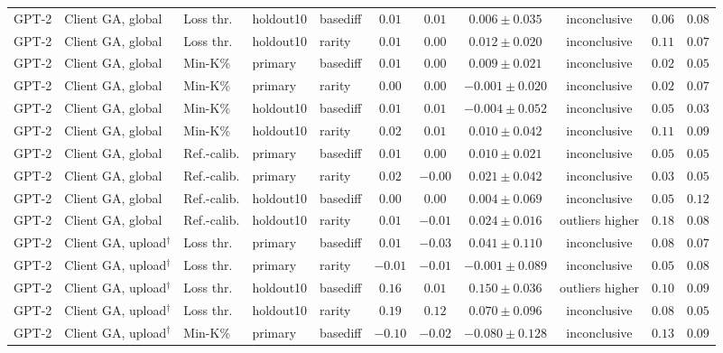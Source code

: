 \begin{table}[t]
\begin{tabular*}{\textwidth}{@{\extracolsep{\fill}}lllllcccccc@{}}
GPT-2 & Client GA, global & Loss thr. & holdout10 & basediff & $0.01$ & $0.01$ & $0.006 \pm 0.035$ & inconclusive & $0.06$ & $0.08$ \\
GPT-2 & Client GA, global & Loss thr. & holdout10 & rarity & $0.01$ & $0.00$ & $0.012 \pm 0.020$ & inconclusive & $0.11$ & $0.07$ \\
GPT-2 & Client GA, global & Min-K\% & primary & basediff & $0.01$ & $0.00$ & $0.009 \pm 0.021$ & inconclusive & $0.02$ & $0.05$ \\
GPT-2 & Client GA, global & Min-K\% & primary & rarity & $0.00$ & $0.00$ & $-0.001 \pm 0.020$ & inconclusive & $0.02$ & $0.07$ \\
GPT-2 & Client GA, global & Min-K\% & holdout10 & basediff & $0.01$ & $0.01$ & $-0.004 \pm 0.052$ & inconclusive & $0.05$ & $0.03$ \\
GPT-2 & Client GA, global & Min-K\% & holdout10 & rarity & $0.02$ & $0.01$ & $0.010 \pm 0.042$ & inconclusive & $0.11$ & $0.09$ \\
GPT-2 & Client GA, global & Ref.-calib. & primary & basediff & $0.01$ & $0.00$ & $0.010 \pm 0.021$ & inconclusive & $0.05$ & $0.05$ \\
GPT-2 & Client GA, global & Ref.-calib. & primary & rarity & $0.02$ & $-0.00$ & $0.021 \pm 0.042$ & inconclusive & $0.03$ & $0.05$ \\
GPT-2 & Client GA, global & Ref.-calib. & holdout10 & basediff & $0.00$ & $0.00$ & $0.004 \pm 0.069$ & inconclusive & $0.05$ & $0.12$ \\
GPT-2 & Client GA, global & Ref.-calib. & holdout10 & rarity & $0.01$ & $-0.01$ & $0.024 \pm 0.016$ & outliers higher & $0.18$ & $0.08$ \\
GPT-2 & Client GA, upload$^{\dagger}$ & Loss thr. & primary & basediff & $0.01$ & $-0.03$ & $0.041 \pm 0.110$ & inconclusive & $0.08$ & $0.07$ \\
GPT-2 & Client GA, upload$^{\dagger}$ & Loss thr. & primary & rarity & $-0.01$ & $-0.01$ & $-0.001 \pm 0.089$ & inconclusive & $0.05$ & $0.08$ \\
GPT-2 & Client GA, upload$^{\dagger}$ & Loss thr. & holdout10 & basediff & $0.16$ & $0.01$ & $0.150 \pm 0.036$ & outliers higher & $0.10$ & $0.09$ \\
GPT-2 & Client GA, upload$^{\dagger}$ & Loss thr. & holdout10 & rarity & $0.19$ & $0.12$ & $0.070 \pm 0.096$ & inconclusive & $0.08$ & $0.05$ \\
GPT-2 & Client GA, upload$^{\dagger}$ & Min-K\% & primary & basediff & $-0.10$ & $-0.02$ & $-0.080 \pm 0.128$ & inconclusive & $0.13$ & $0.09$ \\

\end{tabular*}
\end{table}
